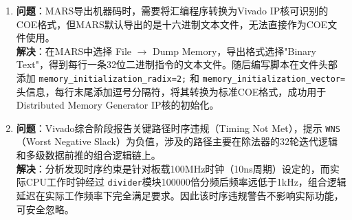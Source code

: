 \begin{enumerate}[leftmargin=2em]
    \item \textbf{问题}：MARS导出机器码时，需要将汇编程序转换为Vivado IP核可识别的COE格式，但MARS默认导出的是十六进制文本文件，无法直接作为COE文件使用。\\
          \textbf{解决}：在MARS中选择 File $\rightarrow$ Dump Memory，导出格式选择"Binary Text"，得到每行一条32位二进制指令的文本文件。随后编写脚本在文件头部添加 \texttt{memory\_initialization\_radix=2;} 和 \texttt{memory\_initialization\_vector=} 头信息，每行末尾添加逗号分隔符，将其转换为标准COE格式，成功用于Distributed Memory Generator IP核的初始化。

    \item \textbf{问题}：Vivado综合阶段报告关键路径时序违规（Timing Not Met），提示 \texttt{WNS}（Worst Negative Slack）为负值，涉及的路径主要在除法器的32轮迭代逻辑和多级数据前推的组合逻辑链上。\\
          \textbf{解决}：分析发现时序约束是针对板载100MHz时钟（10ns周期）设定的，而实际CPU工作时钟经过 \texttt{divider}模块100000倍分频后频率远低于1kHz，组合逻辑延迟在实际工作频率下完全满足要求。因此该时序违规警告不影响实际功能，可安全忽略。

\end{enumerate}


